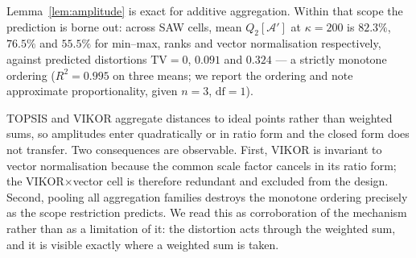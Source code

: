 \begin{remark}
\label{rem:scope}
Lemma~\ref{lem:amplitude} is exact for additive aggregation.
Within that scope the prediction is borne out: across SAW cells,
mean $Q_2[\mathcal{A}']$ at $\kappa=200$ is $82.3\%$, $76.5\%$ and
$55.5\%$ for min--max, ranks and vector normalisation respectively,
against predicted distortions $\mathrm{TV}=0$, $0.091$ and $0.324$ ---
a strictly monotone ordering ($R^2=0.995$ on three means; we report the
ordering and note approximate proportionality, given $n=3$, $\mathrm{df}=1$).

TOPSIS and VIKOR aggregate distances to ideal points rather than
weighted sums, so amplitudes enter quadratically or in ratio form and
the closed form does not transfer.
Two consequences are observable.
First, VIKOR is invariant to vector normalisation because the common
scale factor cancels in its ratio form; the VIKOR$\times$vector cell is
therefore redundant and excluded from the design.
Second, pooling all aggregation families destroys the monotone ordering
precisely as the scope restriction predicts.
We read this as corroboration of the mechanism rather than as a
limitation of it: the distortion acts through the weighted sum, and
it is visible exactly where a weighted sum is taken.
\end{remark}

